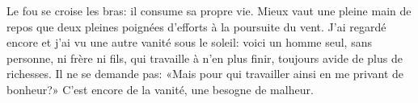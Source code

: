 Le fou se croise les bras: il consume sa propre vie.
Mieux vaut une pleine main de repos
	que deux pleines poignées d’efforts à la poursuite du vent.
J’ai regardé encore et j’ai vu une autre vanité sous le soleil:
	voici un homme seul, sans personne, ni frère ni fils,
	qui travaille à n’en plus finir, toujours avide de plus de richesses.
Il ne se demande pas:
		«Mais pour qui travailler ainsi en me privant de bonheur?»
	C’est encore de la vanité, une besogne de malheur.

